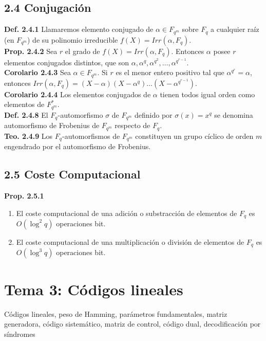 \documentclass{article}
\begin{document}
\subsection{2.4 Conjugación}

\textbf{Def. 2.4.1}
Llamaremos elemento conjugado de $\alpha \in F_{q^m}$ sobre $F_q$ a cualquier raíz (en $F_{q^m}$) de su polinomio irreducible $f(X) = Irr(\alpha, F_q)$.\\

\textbf{Prop. 2.4.2}
Sea $r$ el grado de $f(X) = Irr(\alpha, F_q)$. Entonces $\alpha$ posee $r$ elementos conjugados distintos, que son $\alpha, \alpha^q, \alpha^{q^2}, \dots, \alpha^{q^{r-1}}$.\\

\textbf{Corolario 2.4.3}
Sea $\alpha \in F_{q^m}$. Si $r$ es el menor entero positivo tal que $\alpha^{q^r} = \alpha$, entonces $Irr(\alpha, F_q) = (X - \alpha)(X - \alpha^q) \dots (X - \alpha^{q^{r-1}})$.\\

\textbf{Corolario 2.4.4}
Los elementos conjugados de $\alpha$ tienen todos igual orden como elementos de $F_{q^m}^*$.\\

\textbf{Def. 2.4.8}
El $F_q$-automorfismo $\sigma$ de $F_{q^m}$ definido por $\sigma(x) = x^q$ se denomina automorfismo de Frobenius de $F_{q^m}$ respecto de $F_q$.\\

\textbf{Teo. 2.4.9}
Los $F_q$-automorfismos de $F_{q^m}$ constituyen un grupo cíclico de orden $m$ engendrado por el automorfismo de Frobenius.\\

\subsection{2.5 Coste Computacional}
\textbf{Prop. 2.5.1}
\begin{enumerate}
\item[a)] El coste computacional de una adición o substracción de elementos de $F_q$ es $O(\log^2 q)$ operaciones bit.
\item[b)] El coste computacional de una multiplicación o división de elementos de $F_q$ es $O(\log^3 q)$ operaciones bit.
\end{enumerate}

\newpage
\section{Tema 3: Códigos lineales}
Códigos lineales, peso de Hamming, parámetros fundamentales, matriz generadora, código sistemático, matriz de control, código dual, decodificación por síndromes
\end{document}
